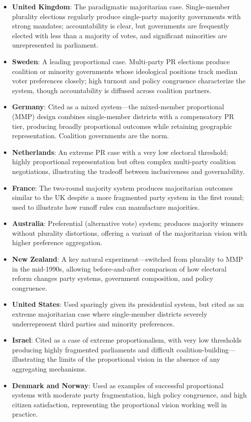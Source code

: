 \documentclass[12pt]{article}
\begin{document}
\begin{itemize}[leftmargin=*, itemsep=4pt]
    \item \textbf{United Kingdom}: The paradigmatic majoritarian case. Single-member plurality elections regularly produce single-party majority governments with strong mandates; accountability is clear, but governments are frequently elected with less than a majority of votes, and significant minorities are unrepresented in parliament.
    \item \textbf{Sweden}: A leading proportional case. Multi-party PR elections produce coalition or minority governments whose ideological positions track median voter preferences closely; high turnout and policy congruence characterize the system, though accountability is diffused across coalition partners.
    \item \textbf{Germany}: Cited as a mixed system---the mixed-member proportional (MMP) design combines single-member districts with a compensatory PR tier, producing broadly proportional outcomes while retaining geographic representation. Coalition governments are the norm.
    \item \textbf{Netherlands}: An extreme PR case with a very low electoral threshold; highly proportional representation but often complex multi-party coalition negotiations, illustrating the tradeoff between inclusiveness and governability.
    \item \textbf{France}: The two-round majority system produces majoritarian outcomes similar to the UK despite a more fragmented party system in the first round; used to illustrate how runoff rules can manufacture majorities.
    \item \textbf{Australia}: Preferential (alternative vote) system; produces majority winners without plurality distortions, offering a variant of the majoritarian vision with higher preference aggregation.
    \item \textbf{New Zealand}: A key natural experiment---switched from plurality to MMP in the mid-1990s, allowing before-and-after comparison of how electoral reform changes party systems, government composition, and policy congruence.
    \item \textbf{United States}: Used sparingly given its presidential system, but cited as an extreme majoritarian case where single-member districts severely underrepresent third parties and minority preferences.
    \item \textbf{Israel}: Cited as a case of extreme proportionalism, with very low thresholds producing highly fragmented parliaments and difficult coalition-building---illustrating the limits of the proportional vision in the absence of any aggregating mechanisms.
    \item \textbf{Denmark and Norway}: Used as examples of successful proportional systems with moderate party fragmentation, high policy congruence, and high citizen satisfaction, representing the proportional vision working well in practice.
\end{itemize}
\end{document}
